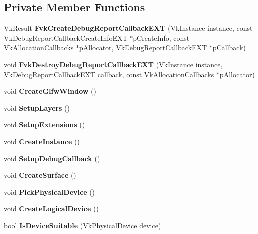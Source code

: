 \subsection*{Private Member Functions}
\begin{DoxyCompactItemize}
\item 
\mbox{\label{class_flounder_1_1_display_a22a7a02951e9fc936c1a4e8a0034bd7d}} 
Vk\+Result {\bfseries Fvk\+Create\+Debug\+Report\+Callback\+E\+XT} (Vk\+Instance instance, const Vk\+Debug\+Report\+Callback\+Create\+Info\+E\+XT $\ast$p\+Create\+Info, const Vk\+Allocation\+Callbacks $\ast$p\+Allocator, Vk\+Debug\+Report\+Callback\+E\+XT $\ast$p\+Callback)
\item 
\mbox{\label{class_flounder_1_1_display_a1961a1e44a0030f7300102f2d2f734b7}} 
void {\bfseries Fvk\+Destroy\+Debug\+Report\+Callback\+E\+XT} (Vk\+Instance instance, Vk\+Debug\+Report\+Callback\+E\+XT callback, const Vk\+Allocation\+Callbacks $\ast$p\+Allocator)
\item 
\mbox{\label{class_flounder_1_1_display_a69cbdbae038354a285a72b3e80901d5c}} 
void {\bfseries Create\+Glfw\+Window} ()
\item 
\mbox{\label{class_flounder_1_1_display_a3500b1275516b480cf4295cbe4f0fb23}} 
void {\bfseries Setup\+Layers} ()
\item 
\mbox{\label{class_flounder_1_1_display_ace285b9632e4b674598b30a23c2f64ea}} 
void {\bfseries Setup\+Extensions} ()
\item 
\mbox{\label{class_flounder_1_1_display_a1f34262d839b04d335f9360939a45aa1}} 
void {\bfseries Create\+Instance} ()
\item 
\mbox{\label{class_flounder_1_1_display_ad363b4b4c95193e74fbec773ec1c52c4}} 
void {\bfseries Setup\+Debug\+Callback} ()
\item 
\mbox{\label{class_flounder_1_1_display_ace7ebd56f0b162c37e73407fb3346d84}} 
void {\bfseries Create\+Surface} ()
\item 
\mbox{\label{class_flounder_1_1_display_a0e9981cd7aec10ff76399f40931d2962}} 
void {\bfseries Pick\+Physical\+Device} ()
\item 
\mbox{\label{class_flounder_1_1_display_a06d38c191f1d5bf9ad351e207d4ef70b}} 
void {\bfseries Create\+Logical\+Device} ()
\item 
\mbox{\label{class_flounder_1_1_display_a0d164b990f4cafff27aacb4200c391cf}} 
bool {\bfseries Is\+Device\+Suitable} (Vk\+Physical\+Device device)
\end{DoxyCompactItemize}
